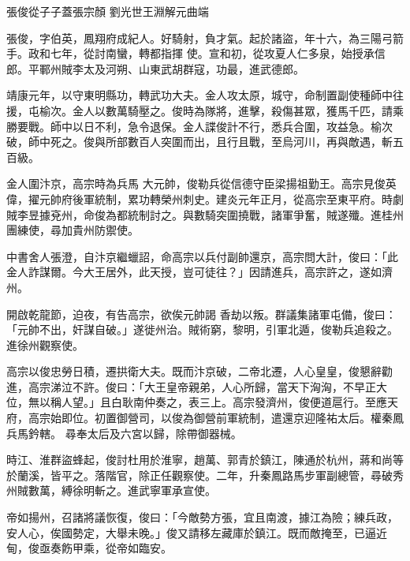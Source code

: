 
\begin{pinyinscope}

 張俊從子子蓋張宗顏
 劉光世王淵解元曲端



 張俊，字伯英，鳳翔府成紀人。好騎射，負才氣。起於諸盜，年十六，為三陽弓箭手。政和七年，從討南蠻，轉都指揮
 使。宣和初，從攻夏人仁多泉，始授承信郎。平鄆州賊李太及河朔、山東武胡群寇，功最，進武德郎。



 靖康元年，以守東明縣功，轉武功大夫。金人攻太原，城守，命制置副使種師中往援，屯榆次。金人以數萬騎壓之。俊時為隊將，進擊，殺傷甚眾，獲馬千匹，請乘勝要戰。師中以日不利，急令退保。金人諜俊計不行，悉兵合圍，攻益急。榆次破，師中死之。俊與所部數百人突圍而出，且行且戰，至烏河川，再與敵遇，斬五百級。



 金人圍汴京，高宗時為兵馬
 大元帥，俊勒兵從信德守臣梁揚祖勤王。高宗見俊英偉，擢元帥府後軍統制，累功轉榮州刺史。建炎元年正月，從高宗至東平府。時劇賊李昱據兗州，命俊為都統制討之。與數騎突圍撓戰，諸軍爭奮，賊遂殲。進桂州團練使，尋加貴州防禦使。



 中書舍人張澄，自汴京繼蠟詔，命高宗以兵付副帥還京，高宗問大計，俊曰：「此金人詐謀爾。今大王居外，此天授，豈可徒往？」因請進兵，高宗許之，遂如濟州。



 開啟乾龍節，迫夜，有告高宗，欲俟元帥謁
 香劫以叛。群議集諸軍屯備，俊曰：「元帥不出，奸謀自破。」遂徙州治。賊術窮，黎明，引軍北遁，俊勒兵追殺之。進徐州觀察使。



 高宗以俊忠勞日積，遷拱衛大夫。既而汴京破，二帝北遷，人心皇皇，俊懇辭勸進，高宗涕泣不許。俊曰：「大王皇帝親弟，人心所歸，當天下洶洶，不早正大位，無以稱人望。」且白耿南仲奏之，表三上。高宗發濟州，俊便道扈行。至應天府，高宗始即位。初置御營司，以俊為御營前軍統制，遣還京迎隆祐太后。權秦鳳兵馬鈐轄。
 尋奉太后及六宮以歸，除帶御器械。



 時江、淮群盜蜂起，俊討杜用於淮寧，趙萬、郭青於鎮江，陳通於杭州，蔣和尚等於蘭溪，皆平之。落階官，除正任觀察使。二年，升秦鳳路馬步軍副總管，尋破秀州賊數萬，縛徐明斬之。進武寧軍承宣使。



 帝如揚州，召諸將議恢復，俊曰：「今敵勢方張，宜且南渡，據江為險；練兵政，安人心，俟國勢定，大舉未晚。」俊又請移左藏庫於鎮江。既而敵掩至，已逼近甸，俊亟奏飭甲乘，從帝如臨安。




\end{pinyinscope}
